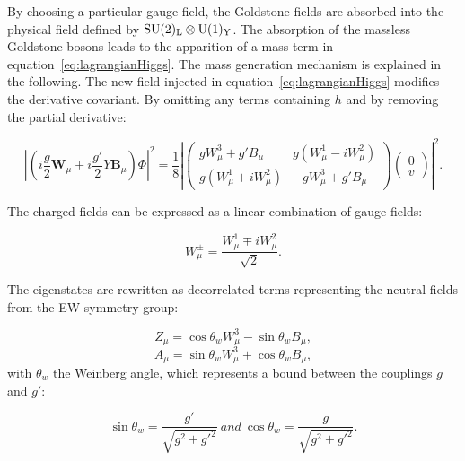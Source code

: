       By choosing a particular gauge field, the Goldstone fields are absorbed into the physical field defined by $\rm{SU}(2)_{\rm{L}} \otimes \rm{U}(1)_{\rm{Y}}$.
      The absorption of the massless Goldstone bosons leads to the apparition of a mass term in equation~\ref{eq:lagrangianHiggs}.
      The mass generation mechanism is explained in the following.
      The new field injected in equation~\ref{eq:lagrangianHiggs} modifies the derivative covariant.
      By omitting any terms containing $h$ and by removing the partial derivative: 

      \begin{equation}
        \left|\left(i\frac{g}{2}\textbf{W}_{\mu} +i\frac{g'}{2}Y\textbf{B}_{\mu}\right) \Phi \right|^2 = \frac{1}{8}\left|
                \begin{pmatrix}
                   gW^3_{\mu} +g'B_{\mu} & g(W^1_{\mu} - i W^2_{\mu}) \\
                   g(W^1_{\mu} + i W^2_{\mu}) & - g W^3_{\mu} + g'B_{\mu}
                \end{pmatrix}
                \begin{pmatrix}
                  0 \\
                  v
                \end{pmatrix}
           \right|^2.
        \label{eq:derHiggs}
      \end{equation}

      The charged fields can be expressed as a linear combination of gauge fields:

      \begin{equation}
        W^{\pm}_{\mu} = \frac{W^1_{\mu} \mp iW^2_{\mu}}{\sqrt{2}}.
      \end{equation}

      The eigenstates are rewritten as decorrelated terms representing the neutral fields from the \gls{EW} symmetry group:

      \begin{equation}
        Z_{\mu} = \cos{\theta_{w}W^3_{\mu}} - \sin{\theta_{w}B_{\mu}},
      \end{equation}
      \begin{equation}
        A_{\mu} = \sin{\theta_{w}W^3_{\mu}} + \cos{\theta_{w}B_{\mu}},
      \end{equation}
      with $\theta_{w}$ the Weinberg angle, which represents a bound between the couplings $g$ and $g'$:
     
      \begin{equation}
        \sin{\theta_{w}} = \frac{g'}{\sqrt{g^2+g'^2}} \ and \ \cos{\theta_{w}} = \frac{g}{\sqrt{g^2+g'^2}}.
      \end{equation} 

